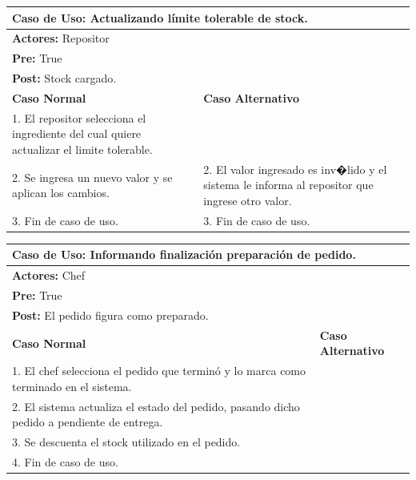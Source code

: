 \documentclass[a4paper,11pt] {article}
\begin{document}
\begin{center}
	\begin{tabular}{ | p{6.5cm} | p{6.5cm} | }
		\hline
			\multicolumn{2}{|l|}{\textbf{Caso de Uso:} Actualizando l\'imite tolerable de stock.} \\
		\hline
			\multicolumn{2}{|l|}{\textbf{Actores:} Repositor} \\
		\hline
			\multicolumn{2}{|l|}{\textbf{Pre:} True} \\
		\hline
			\multicolumn{2}{|l|}{\textbf{Post:} Stock cargado.} \\
		\hline
		\textbf{Caso Normal} & \textbf{Caso Alternativo}	\\
		\hline
		1. El repositor selecciona el ingrediente del cual quiere actualizar el limite tolerable. &	\\
		\hline
		2. Se ingresa un nuevo valor y se aplican los cambios. & 2. El valor ingresado es inv�lido y el sistema le informa al repositor que ingrese otro valor.	\\
		\hline
		3. Fin de caso de uso. & 3. Fin de caso de uso.	\\
		\hline
	\end{tabular}
\end{center}

\begin{center}
	\begin{tabular}{ | p{6.5cm} | p{6.5cm} | }
		\hline
			\multicolumn{2}{|l|}{\textbf{Caso de Uso:} Informando finalizaci\'on preparaci\'on de pedido.} \\
		\hline
			\multicolumn{2}{|l|}{\textbf{Actores:} Chef} \\
		\hline
			\multicolumn{2}{|l|}{\textbf{Pre:} True} \\
		\hline
			\multicolumn{2}{|l|}{\textbf{Post:} El pedido figura como preparado.} \\
		\hline
		\textbf{Caso Normal} & \textbf{Caso Alternativo}	\\
		\hline
		1. El chef selecciona el pedido que termin\'o y lo marca como terminado en el sistema. &	\\
		\hline
		2. El sistema actualiza el estado del pedido, pasando dicho pedido a pendiente de entrega. &	\\
		\hline
		3. Se descuenta el stock utilizado en el pedido. &	\\
		\hline
		4. Fin de caso de uso. &	\\
		\hline
	\end{tabular}
\end{center}
\end{document}
